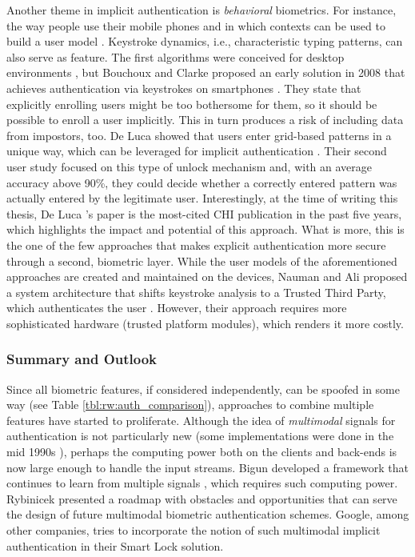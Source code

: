 	
	Another theme in implicit authentication is \textit{behavioral} biometrics. For instance, the way people use their mobile phones and in which contexts can be used to build a user model \cite{Jakobsson2009ImplicitAuthentication}. Keystroke dynamics, i.e., characteristic typing patterns, can also serve as feature. The first algorithms were conceived for desktop environments \cite{Crawford2010KeystrokeDynamics}, but Bouchoux and Clarke proposed an early solution in 2008 that achieves authentication via keystrokes on smartphones \cite{Buchoux2008KeystrokeAnalysis}. They state that explicitly enrolling users might be too bothersome for them, so it should be possible to enroll a user implicitly. This in turn produces a risk of including data from impostors, too. De Luca showed that users enter grid-based patterns in a unique way, which can be leveraged for implicit authentication \cite{DeLuca2012TouchMeOnce}. Their second user study focused on this type of unlock mechanism and, with an average accuracy above 90\%, they could decide whether a correctly entered pattern was actually entered by the legitimate user. Interestingly, at the time of writing this thesis, De Luca \etal's paper is the most-cited CHI publication in the past five  years, which highlights the impact and potential of this approach. What is more, this is the one of the few approaches that makes explicit authentication more secure through a second, biometric layer. While the user models of the aforementioned approaches are created and maintained on the devices, Nauman and Ali proposed a system architecture that shifts keystroke analysis to a Trusted Third Party, which authenticates the user \cite{Nauman2010TOKEN}. However, their approach requires more sophisticated hardware (trusted platform modules), which renders it more costly.

	\subsubsection{Summary and Outlook}
	Since all biometric features, if considered independently, can be spoofed in some way (see Table \ref{tbl:rw:auth_comparison}), approaches to combine multiple features have started to proliferate. Although the idea of \textit{multimodal} signals for authentication is not particularly new (some implementations were done in the mid 1990s \cite{Brunelli1995PersonIdentificationMultipleCues}), perhaps the computing power both on the clients and back-ends is now large enough to handle the input streams. Bigun \etal developed a framework that continues to learn from multiple signals \cite{Bigun2005CombiningBiometricEvidence}, which requires such computing power.	Rybinicek \etal presented a roadmap with obstacles and opportunities \cite{Rybnicek2014RoadmapContinuousAuth} that can serve the design of future multimodal biometric authentication schemes. Google, among other companies, tries to incorporate the notion of such multimodal implicit authentication in their Smart Lock solution. 
	
